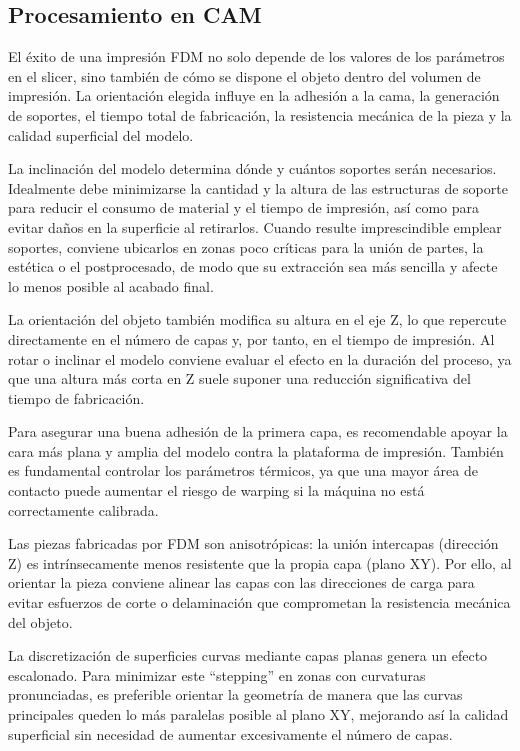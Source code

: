 \subsection{Procesamiento en CAM}

El éxito de una impresión FDM no solo depende de los valores de los parámetros en el slicer, sino también de cómo se dispone el objeto dentro del volumen de impresión. La orientación elegida influye en la adhesión a la cama, la generación de soportes, el tiempo total de fabricación, la resistencia mecánica de la pieza y la calidad superficial del modelo.

La inclinación del modelo determina dónde y cuántos soportes serán necesarios. Idealmente debe minimizarse la cantidad y la altura de las estructuras de soporte para reducir el consumo de material y el tiempo de impresión, así como para evitar daños en la superficie al retirarlos. Cuando resulte imprescindible emplear soportes, conviene ubicarlos en zonas poco críticas para la unión de partes, la estética o el postprocesado, de modo que su extracción sea más sencilla y afecte lo menos posible al acabado final.

La orientación del objeto también modifica su altura en el eje Z, lo que repercute directamente en el número de capas y, por tanto, en el tiempo de impresión. Al rotar o inclinar el modelo conviene evaluar el efecto en la duración del proceso, ya que una altura más corta en Z suele suponer una reducción significativa del tiempo de fabricación.

Para asegurar una buena adhesión de la primera capa, es recomendable apoyar la cara más plana y amplia del modelo contra la plataforma de impresión. También es fundamental controlar los parámetros térmicos, ya que una mayor área de contacto puede aumentar el riesgo de warping si la máquina no está correctamente calibrada.

Las piezas fabricadas por FDM son anisotrópicas: la unión intercapas (dirección Z) es intrínsecamente menos resistente que la propia capa (plano XY). Por ello, al orientar la pieza conviene alinear las capas con las direcciones de carga para evitar esfuerzos de corte o delaminación que comprometan la resistencia mecánica del objeto.

La discretización de superficies curvas mediante capas planas genera un efecto escalonado. Para minimizar este “stepping” en zonas con curvaturas pronunciadas, es preferible orientar la geometría de manera que las curvas principales queden lo más paralelas posible al plano XY, mejorando así la calidad superficial sin necesidad de aumentar excesivamente el número de capas.

